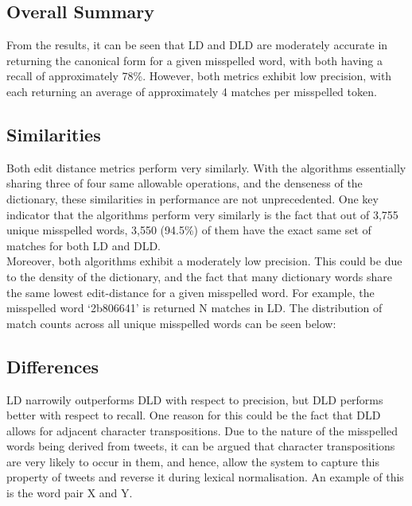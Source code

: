 \documentclass[11pt]{article}
\begin{document}


\subsection{Overall Summary}
From the results, it can be seen that LD and DLD are moderately accurate in returning the canonical form for a given misspelled word, with both having a recall of approximately 78\%. However, both metrics exhibit low precision, with each returning an average of approximately 4 matches per misspelled token.


\subsection{Similarities}
Both edit distance metrics perform very similarly. With the algorithms essentially sharing three of four same allowable operations, and the denseness of the dictionary, these similarities in performance are not unprecedented. One key indicator that the algorithms perform very similarly is the fact that out of 3,755 unique misspelled words, 3,550 (94.5\%) of them have the exact same set of matches for both LD and DLD.
\\

Moreover, both algorithms exhibit a moderately low precision. This could be due to the density of the dictionary, and the fact that many dictionary words share the same lowest edit-distance for a given misspelled word. For example, the misspelled word `2b806641' is returned N matches in LD. The distribution of match counts across all unique misspelled words can be seen below:



\subsection{Differences}

LD narrowily outperforms DLD with respect to precision, but DLD performs better with respect to recall. One reason for this could be the fact that  DLD allows for adjacent character transpositions. Due to the nature of the misspelled words being derived from tweets, it can be argued that character transpositions are very likely to occur in them, and hence, allow the system to capture this property of tweets and reverse it during lexical normalisation. An example of this is the word pair X and Y.
\\
\end{document}
